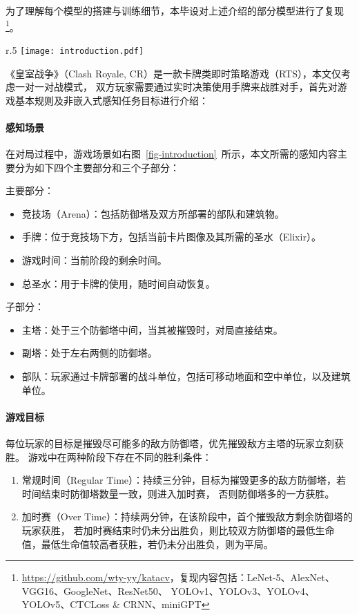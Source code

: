 为了理解每个模型的搭建与训练细节，本毕设对上述介绍的部分模型进行了复现\footnote{\url{https://github.com/wty-yy/katacv}，复现内容包括：LeNet-5、AlexNet、VGG16、GoogleNet、ResNet50、
YOLOv1、YOLOv3、YOLOv4、YOLOv5、CTCLoss \& CRNN、miniGPT}。

\begin{wrapfigure}[24]{r}{.5\textwidth} %
  \centering\vspace*{-10ex}
  \texttt{[image: introduction.pdf]}
  \caption{右上角为当前阶段的剩余时间；中间部分为竞技场，其上有双方所部署的部队及建筑；
  下方显示了可用手牌以及部署所需的圣水，最下方显示了当前的可用圣水总量。}
  \label{fig-introduction}
\end{wrapfigure}
《皇室战争》（Clash Royale, CR）是一款卡牌类即时策略游戏（RTS），本文仅考虑一对一对战模式，
双方玩家需要通过实时决策使用手牌来战胜对手，首先对游戏基本规则及非嵌入式感知任务目标进行介绍：
\paragraph*{感知场景}在对局过程中，游戏场景如右图~\ref{fig-introduction}~所示，本文所需的感知内容主要分为如下四个主要部分和三个子部分：

\noindent 主要部分：
\begin{itemize}
  \item 竞技场（Arena）：包括防御塔及双方所部署的部队和建筑物。
  \item 手牌：位于竞技场下方，包括当前卡片图像及其所需的圣水（Elixir）。
  \item 游戏时间：当前阶段的剩余时间。
  \item 总圣水：用于卡牌的使用，随时间自动恢复。
\end{itemize}

\noindent 子部分：
\begin{itemize}
  \item 主塔：处于三个防御塔中间，当其被摧毁时，对局直接结束。
  \item 副塔：处于左右两侧的防御塔。
  \item 部队：玩家通过卡牌部署的战斗单位，包括可移动地面和空中单位，以及建筑单位。
\end{itemize}
\paragraph*{游戏目标}每位玩家的目标是摧毁尽可能多的敌方防御塔，优先摧毁敌方主塔的玩家立刻获胜。
游戏中在两种阶段下存在不同的胜利条件：\label{game-target}
\begin{enumerate}
  \item 常规时间（Regular Time）：持续三分钟，目标为摧毁更多的敌方防御塔，若时间结束时防御塔数量一致，则进入加时赛，
  否则防御塔多的一方获胜。
  \item 加时赛（Over Time）：持续两分钟，在该阶段中，首个摧毁敌方剩余防御塔的玩家获胜，
  若加时赛结束时仍未分出胜负，则比较双方防御塔的最低生命值，最低生命值较高者获胜，若仍未分出胜负，则为平局。
\end{enumerate}
